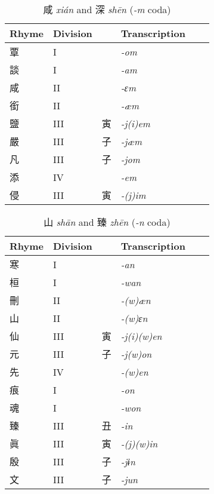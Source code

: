\documentclass[oneside,a4paper,11pt]{article}
\newcommand{\ipa}[1]{{\phon\textit{#1}}}
\newcommand{\zh}[1]{{\cn #1}}
\newcommand{\zhc}[2]{\zh{#1} \ipa{#2}}
\begin{document}
\begin{table}[H]
\caption{\zhc{咸}{xián} and \zhc{深}{shēn} (\ipa{-m} coda)} \centering \label{tab:xian}
\begin{tabular}{llllll}
\toprule
Rhyme & Division & & Transcription \\
\midrule
\zh{覃} &	I &	 &	\ipa{-om} &	\\
\zh{談} &	I &	 &	\ipa{-am} &	\\
\zh{咸} &	II &	 &	\ipa{-ɛm} &	\\
\zh{銜} &	II &	 &	\ipa{-æm} &	\\
\zh{鹽} &	III &	\zh{寅} &	\ipa{-j(i)em} &	\\
\zh{嚴} &	III &	\zh{子} &	\ipa{-jæm} &	\\
\zh{凡} &	III &	\zh{子} &	\ipa{-jom} &	\\
\zh{添} &	IV &	 &	\ipa{-em} &	\\
\midrule
\zh{侵} &	III &	\zh{寅} &	\ipa{-(j)im} &	\\
\bottomrule
\end{tabular}
\end{table}

\begin{table}[H]
\caption{\zhc{山}{shān} and \zhc{臻}{zhēn} (\ipa{-n} coda)} \centering \label{tab:shan}
\begin{tabular}{llllll}
\toprule
Rhyme & Division & & Transcription \\
\midrule
\zh{寒} & 	I & 	& 	\ipa{-an} & 	\\
\zh{桓} & 	I & 	& 	\ipa{-wan} & 	\\
\zh{刪} & 	II & 	& 	\ipa{-(w)æn} & 	\\
\zh{山} & 	II & 	& 	\ipa{-(w)ɛn} & 	\\
\zh{仙} & 	III & 	\zh{寅} & 	\ipa{-j(i)(w)en} & 	\\
\zh{元} & 	III & 	\zh{子} & 	\ipa{-j(w)on} & 	\\
\zh{先} & 	IV & 	& 	\ipa{-(w)en} & 	\\
\midrule
\zh{痕} & 	I & 	& 	\ipa{-on} & 	\\
\zh{魂} & 	I & 	& 	\ipa{-won} & 	\\
\zh{臻} & 	III & 	\zh{丑} & 	\ipa{-in} & 	\\
\zh{眞} & 	III & 	\zh{寅} & 	\ipa{-(j)(w)in} & 	\\
\zh{殷} & 	III & 	\zh{子} & 	\ipa{-jɨn} & 	\\
\zh{文} & 	III & 	\zh{子} & 	\ipa{-jun} & 	\\
\bottomrule
\end{tabular}
\end{table}
\end{document}
